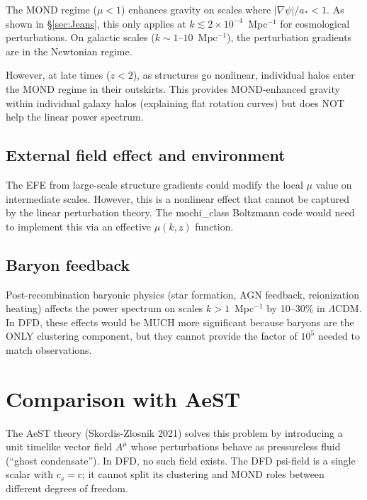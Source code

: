 \documentclass[aps,prd,twocolumn,nofootinbib]{revtex4-2}
\newcommand{\astar}{a_*}
\newcommand{\ee}[1]{\times 10^{#1}}
\newcommand{\LCDM}{$\Lambda$CDM}
\begin{document}
The MOND regime ($\mu < 1$) enhances gravity on scales where
$|\nabla\psi|/\astar < 1$. As shown in \S\ref{sec:Jeans}, this
only applies at $k \lesssim 2\ee{-4}$~Mpc$^{-1}$ for cosmological
perturbations. On galactic scales ($k \sim 1$--$10$~Mpc$^{-1}$),
the perturbation gradients are in the Newtonian regime.

However, at late times ($z < 2$), as structures go nonlinear,
individual halos enter the MOND regime in their outskirts. This
provides MOND-enhanced gravity within individual galaxy halos
(explaining flat rotation curves) but does NOT help the linear power
spectrum.

\subsection{External field effect and environment}

The EFE from large-scale structure gradients could modify the local
$\mu$ value on intermediate scales. However, this is a nonlinear
effect that cannot be captured by the linear perturbation theory.
The mochi\_class Boltzmann code would need to implement this via an
effective $\mu(k, z)$ function.

\subsection{Baryon feedback}

Post-recombination baryonic physics (star formation, AGN feedback,
reionization heating) affects the power spectrum on scales
$k > 1$~Mpc$^{-1}$ by 10--30\% in \LCDM. In DFD, these effects
would be MUCH more significant because baryons are the ONLY
clustering component, but they cannot provide the factor of $10^5$
needed to match observations.


\section{Comparison with AeST}
\label{sec:AeST}

The AeST theory (Skordis-Zlosnik 2021) solves this problem by
introducing a unit timelike vector field $A^\mu$ whose perturbations
behave as pressureless fluid (``ghost condensate''). In DFD, no such
field exists. The DFD psi-field is a single scalar with $c_s = c$;
it cannot split its clustering and MOND roles between different
degrees of freedom.
\end{document}

